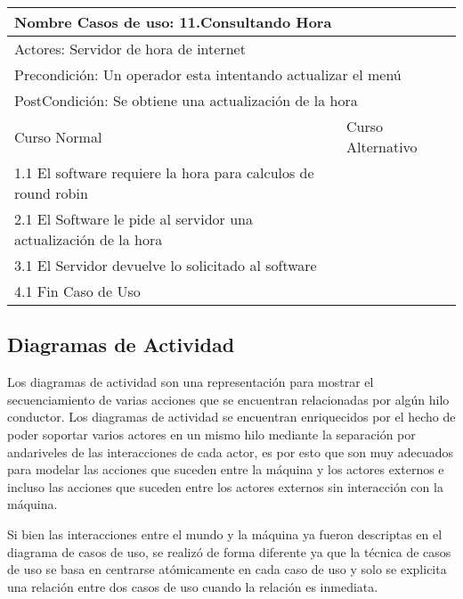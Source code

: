 \documentclass[a4paper,10pt]{article}
\begin{document}
\bigskip

\begin{center}
\begin{tabularx}{14cm}{|X|X|}
\hline
\multicolumn{2}{|l|}{Nombre Casos de uso: 11.Consultando Hora}\\
\hline
\multicolumn{2}{|l|}{Actores: Servidor de hora de internet}\\
\hline
\multicolumn{2}{|l|}{Precondici\'on: Un operador esta intentando actualizar el men\'u}\\
\hline
\multicolumn{2}{|l|}{PostCondici\'on: Se obtiene una actualizaci\'on de la hora}\\
\hline
Curso Normal & Curso Alternativo\\
\hline
1.1 El software requiere la hora para calculos de round robin & 
\\
\hline
2.1 El Software le pide al servidor una actualizaci\'on de la hora & 
\\
\hline
3.1 El Servidor devuelve lo solicitado al software &
\\
\hline
4.1 Fin Caso de Uso &
\\
\hline
\end{tabularx}
\end{center}

\newpage

\subsection*{Diagramas de Actividad}


Los diagramas de actividad son una representaci\'on para mostrar el secuenciamiento de varias acciones que se encuentran relacionadas por alg\'un
hilo conductor. Los diagramas de actividad se encuentran enriquecidos por el hecho de poder soportar varios actores en un mismo hilo mediante la 
separaci\'on por andariveles de las interacciones de cada actor, es por esto que son muy adecuados para modelar las acciones que suceden entre la
m\'aquina y los actores externos e incluso las acciones que suceden entre los actores externos sin interacci\'on con la m\'aquina.

Si bien las interacciones entre el mundo y la m\'aquina ya fueron descriptas en el diagrama de casos de uso, se realiz\'o de forma diferente
ya que la t\'ecnica de casos de uso se basa en centrarse at\'omicamente en cada caso de uso y solo se explicita una relaci\'on entre dos casos de
uso cuando la relaci\'on es inmediata.
\end{document}
